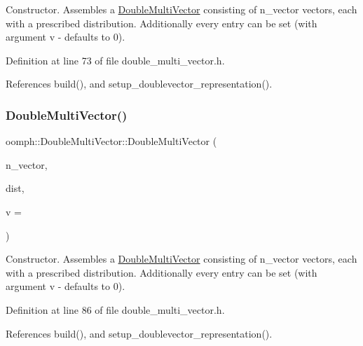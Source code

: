 Constructor. Assembles a \hyperlink{classoomph_1_1DoubleMultiVector}{Double\+Multi\+Vector} consisting of n\+\_\+vector vectors, each with a prescribed distribution. Additionally every entry can be set (with argument v -\/ defaults to 0). 



Definition at line 73 of file double\+\_\+multi\+\_\+vector.\+h.



References build(), and setup\+\_\+doublevector\+\_\+representation().

\mbox{\label{classoomph_1_1DoubleMultiVector_a05fb9669ba09de5a9c375a5f27859200}} 
\subsubsection{\texorpdfstring{Double\+Multi\+Vector()}{DoubleMultiVector()}\hspace{0.1cm}{\footnotesize\ttfamily [3/7]}}
{\footnotesize\ttfamily oomph\+::\+Double\+Multi\+Vector\+::\+Double\+Multi\+Vector (\begin{DoxyParamCaption}\item[{const unsigned \&}]{n\+\_\+vector,  }\item[{const \hyperlink{classoomph_1_1LinearAlgebraDistribution}{Linear\+Algebra\+Distribution} \&}]{dist,  }\item[{const double \&}]{v = {} }\end{DoxyParamCaption})\hspace{0.3cm}{\ttfamily [inline]}}



Constructor. Assembles a \hyperlink{classoomph_1_1DoubleMultiVector}{Double\+Multi\+Vector} consisting of n\+\_\+vector vectors, each with a prescribed distribution. Additionally every entry can be set (with argument v -\/ defaults to 0). 



Definition at line 86 of file double\+\_\+multi\+\_\+vector.\+h.



References build(), and setup\+\_\+doublevector\+\_\+representation().

\mbox{\label{classoomph_1_1DoubleMultiVector_a31b889c87de57fa9a9e994e8e138b8c4}} 
